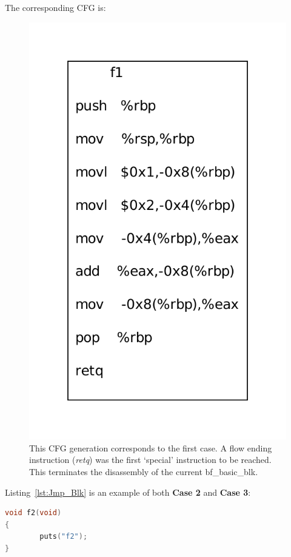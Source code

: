 The corresponding CFG is:

\begin{figure}[H]
 \centering
 \includegraphics[scale=0.55]{Single_Blk.pdf}
 \caption{This CFG generation corresponds to the first case. A flow ending instruction (\emph{retq}) was the first `special' instruction to be reached. This terminates the disassembly of the current bf\_basic\_blk.}
\end{figure}

Listing~\ref{lst:Jmp_Blk} is an example of both \textbf{Case 2} and \textbf{Case 3}:

\noindent\begin{minipage}{\textwidth}
\begin{lstlisting}[language=C,caption={This function results in a procedure call and subsequently an unconditional branch.},label={lst:Jmp_Blk}]
void f2(void)
{ 
        puts("f2");
}
\end{lstlisting}
\end{minipage}

